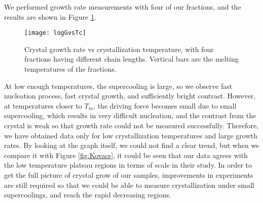 We performed growth rate measurements with four of our fractions, and the results are shown in Figure \ref{fig:logGvsTc}.

\begin{figure}[H]
	\center
	\vspace{1 cm}
	\texttt{[image: logGvsTc]}
	\caption{Crystal growth rate vs crystallization temperature, with four fractions having different chain lengths. Vertical bars are the melting temperatures of the fractions.}
	\label{fig:logGvsTc}
\end{figure}

At low enough temperatures, the supercooling is large, so we observe fast nucleation process, fast crystal growth, and sufficiently bright contrast. However, at temperatures closer to $T_{m}$, the driving force becomes small due to small supercooling, which results in very difficult nucleation, and the contrast from the crystal is weak so that growth rate could not be measured successfully. Therefore, we have obtained data only for low crystallization temperatures and large growth rates. By looking at the graph itself, we could not find a clear trend, but when we compare it with Figure \ref{fig:Kovacs}, it could be seen that our data agrees with the low temperature plateau regions in terms of scale in their study. In order to get the full picture of crystal grow of our samples, improvements in experiments are still required so that we could be able to measure crystallization under small supercoolings, and reach the rapid decreasing regions.